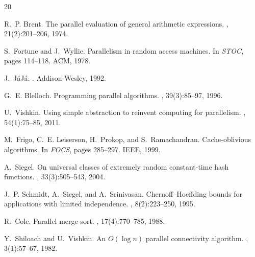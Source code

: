 \documentclass[11pt]{article}
\begin{document}
\begin{thebibliography}{20}

R.~P. Brent.
\newblock The parallel evaluation of general arithmetic expressions.
, 21(2):201--206, 1974.

S.~Fortune and J.~Wyllie.
\newblock Parallelism in random access machines.
\newblock In {\em STOC}, pages 114--118. ACM, 1978.

J.~J\'{a}J\'{a}.
.
\newblock Addison-Wesley, 1992.

G.~E. Blelloch.
\newblock Programming parallel algorithms.
, 39(3):85--97, 1996.

U.~Vishkin.
\newblock Using simple abstraction to reinvent computing for parallelism.
, 54(1):75--85, 2011.

M.~Frigo, C.~E. Leiserson, H.~Prokop, and S.~Ramachandran.
\newblock Cache-oblivious algorithms.
\newblock In {\em FOCS}, pages 285--297. IEEE, 1999.

A.~Siegel.
\newblock On universal classes of extremely random constant-time hash functions.
, 33(3):505--543, 2004.

J.~P. Schmidt, A.~Siegel, and A.~Srinivasan.
\newblock Chernoff--Hoeffding bounds for applications with limited
  independence.
, 8(2):223--250, 1995.

R.~Cole.
\newblock Parallel merge sort.
, 17(4):770--785, 1988.

Y.~Shiloach and U.~Vishkin.
\newblock An $O(\log n)$ parallel connectivity algorithm.
, 3(1):57--67, 1982.

\end{thebibliography}


\appendix
\end{document}
